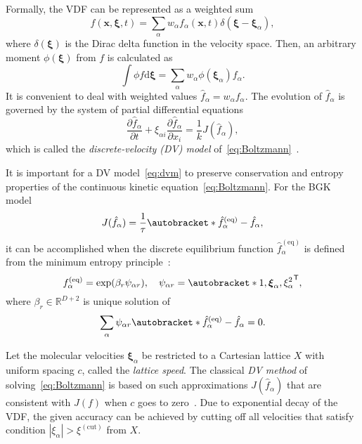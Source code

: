 \documentclass{article}
\newcommand{\dd}{\mathrm{d}}
\newcommand{\pder}[2][]{\frac{\partial#1}{\partial#2}}
\newcommand{\transpose}[1]{#1^\mathsf{T}}
\DeclarePairedDelimiter\autobracket()       %
\newcommand{\br}[1]{\autobracket*{#1}}
\newcommand{\dxi}{\boldsymbol{\dd\xi}}
\newcommand{\bxi}{{\boldsymbol{\xi}}}
\newcommand{\bxia}{\bxi_\alpha}
\newcommand{\bx}{\boldsymbol{x}}
\newcommand{\xiai}{\xi_{\alpha i}}
\newcommand{\equil}[1]{#1^\mathrm{(eq)}}
\begin{document}
Formally, the VDF can be represented as a weighted sum
\begin{equation}\label{eq:discrete_velocity}
    f(\bx,\bxi,t) = \sum_\alpha w_\alpha f_\alpha(\bx,t)\delta(\bxi-\bxia),
\end{equation}
where \(\delta(\bxi)\) is the Dirac delta function in the velocity space.
Then, an arbitrary moment \(\phi(\bxi)\) from \(f\) is calculated as
\begin{equation}\label{eq:cubature}
    \int \phi f\dxi = \sum_\alpha w_\alpha \phi(\bxia) f_\alpha.
\end{equation}
It is convenient to deal with weighted values \(\hat{f}_\alpha = w_\alpha f_\alpha\).
The evolution of \(\hat{f}_\alpha\) is governed by the system of partial differential equations
\begin{equation}\label{eq:dvm}
    \pder[\hat{f}_\alpha]{t} + \xiai\pder[\hat{f}_\alpha]{x_i} = \frac1kJ(\hat{f}_\alpha),
\end{equation}
which is called the \emph{discrete-velocity (DV) model} of~\eqref{eq:Boltzmann}~\cite{Cabannes1980}.

It is important for a DV model~\eqref{eq:dvm} to preserve conservation and entropy properties
of the continuous kinetic equation~\eqref{eq:Boltzmann}.
For the BGK model
\begin{equation}\label{eq:dvm-bgk}
    J(\hat{f}_\alpha) = \frac1\tau\br{\equil{\hat{f}}_\alpha-\hat{f}_\alpha},
\end{equation}
it can be accomplished when the discrete equilibrium function \(\equil{\hat{f}}_\alpha\)
is defined from the minimum entropy principle~\cite{Mieussens2000}:
\begin{equation}\label{eq:equilibrium-bgk}
    \equil{f}_\alpha = \exp(\beta_r\psi_{\alpha r}), \quad
    \psi_{\alpha r} = \transpose{\br{1,\bxia, \xi_\alpha^2}},
\end{equation}
where \(\beta_r\in\mathbb{R}^{D+2}\) is unique solution of
\begin{equation}\label{eq:beta}
    \sum_\alpha\psi_{\alpha r}\br{\equil{\hat{f}}_\alpha - \hat{f}_\alpha} = 0.
\end{equation}

Let the molecular velocities \(\bxia\) be restricted to a Cartesian lattice \(X\)
with uniform spacing \(c\), called the \emph{lattice speed}.
The classical \emph{DV method} of solving~\eqref{eq:Boltzmann} is based on such approximations \(J(\hat{f}_\alpha)\)
that are consistent with \(J(f)\) when \(c\) goes to zero~\cite{Aristov2001}.
Due to exponential decay of the VDF, the given accuracy can be achieved
by cutting off all velocities that satisfy condition \(|\xi_\alpha| > \xi^{(\mathrm{cut})}\) from \(X\).
\end{document}
